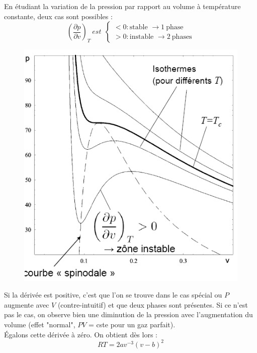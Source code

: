 \documentclass{article}
\begin{document}
	En étudiant la variation de la pression par rapport au volume à température constante, deux cas sont possibles :
	\begin{equation}
	\left(\frac{\partial p}{\partial v}\right)_T\ est\ \ \left\{\begin{array}{l}
	< 0 : \text{stable }\rightarrow 1\ \text{phase}\\
	> 0 : \text{instable }\rightarrow 2\ \text{phases}
	\end{array}\right.
	\end{equation}
	\begin{figure}
	\vspace{-5mm}
		\includegraphics[scale=0.35]{images/image9.png}
	\end{figure}
	Si la dérivée est positive, c'est que l'on se trouve dans le cas spécial ou $P$ augmente avec $V$ (contre-intuitif) et que deux phases sont présentes. Si ce n'est pas le cas, on observe bien une diminution de la pression avec l'augmentation du volume (effet "normal", $PV$ = cste pour un gaz parfait).
	\\
	Égalons cette dérivée à zéro. On obtient dès lors : 
	\begin{equation}
	RT = 2av^{-3}(v-b)^2
	\end{equation}
	
\end{document}
